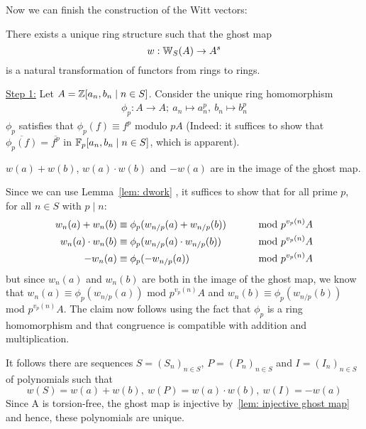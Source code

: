 Now we can finish the construction of the Witt vectors:
\begin{theorem} \label{thm: existence of Witt vectors}
    There exists a unique ring structure such that the ghost map 
    \[
      w:\mathbb{W}_S(A) \to A^s  
    \]
    is a natural transformation of functors from rings to rings.
\end{theorem}
\begin{bigproof}
    \underline{Step 1:} Let $A=\mathbb{Z} [a_n,b_n \mid n \in S]$. Consider the unique
    ring homomorphism 
    \begin{align*}
        \phi_p \colon A \to A; \
        a_n \mapsto a_n^p, \
        b_n \mapsto b_n^p
    \end{align*}
    $\phi_p$ satisfies that $\phi_p(f) \equiv f^p$ modulo $pA$ (Indeed: it suffices to show that $\overline{\phi_p(f)}
    = \overline{f^p}$ in $\mathbb{F}_p[a_n,b_n \mid n \in S]$, which is apparent). \todo{}
    \begin{claim*}
        $w(a)+w(b)$, $w(a) \cdot w(b)$ and $-w(a)$ are in the image of the ghost map.
    \end{claim*}
    \begin{smallproof}
        Since we can use Lemma~\ref{lem: dwork} , it suffices to show that
        for all prime $p$, for all $n \in S$ with $p \mid n$:
        \begin{align*}
           w_n(a)+w_n(b) &\equiv \phi_p(w_{n/p}(a)+w_{n/p}(b)) &\text{\hskip8mm mod } p^{v_p(n)}A \\
           w_n(a)\cdot w_n(b) &\equiv \phi_p(w_{n/p}(a) \cdot w_{n/p}(b)) &\text{\hskip8mm mod } p^{v_p(n)}A \\
           -w_n(a) &\equiv \phi_p(-w_{n/p}(a)) &\text{\hskip8mm mod } p^{v_p(n)}A
        \end{align*} 
        but since $w_n(a)$ and $w_n(b)$ are both in the image of the ghost map, we know that
        $w_n(a) \equiv \phi_p(w_{n/p}(a))$ mod $p^{v_p(n)}A$ and 
        $w_n(b) \equiv \phi_p(w_{n/p}(b))$ mod $p^{v_p(n)}A$.
        The claim now follows using the fact that $\phi_p$ is a ring homomorphism and 
        that congruence is compatible with addition and multiplication.
        \end{smallproof}
    It follows there are sequences $S = (S_n)_{n \in S}$, $P = (P_n)_{n \in S}$
    and $I = (I_n)_{n \in S}$ of polynomials such that
    \[
        w(S) = w(a) + w(b), \ w(P) = w(a) \cdot w(b), \ w(I) = -w(a)
    \]
    Since A is torsion-free, the ghost map is injective by~\ref{lem: injective ghost map}
    and hence, these polynomials are unique.


\end{bigproof}
